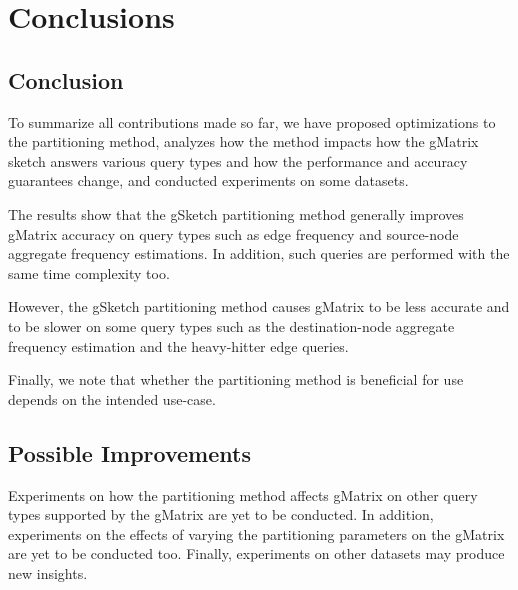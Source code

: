 \chapter{Conclusions}

\ifpdf
\graphicspath{{Chapter4/Figs/Raster/}{Chapter4/Figs/PDF/}{Chapter4/Figs/}}
\else
\graphicspath{{Chapter4/Figs/Vector/}{Chapter4/Figs/}}
\fi

\section{Conclusion}

To summarize all contributions made so far, we have proposed optimizations to the partitioning method, analyzes how the method impacts how the gMatrix sketch answers various query types and how the performance and accuracy guarantees change, and conducted experiments on some datasets.

The results show that the gSketch partitioning method generally improves gMatrix accuracy on query types such as edge frequency and source-node aggregate frequency estimations. In addition, such queries are performed with the same time complexity too.

However, the gSketch partitioning method causes gMatrix to be less accurate and to be slower on some query types such as the destination-node aggregate frequency estimation and the heavy-hitter edge queries.

Finally, we note that whether the partitioning method is beneficial for use depends on the intended use-case.

\section{Possible Improvements}

Experiments on how the partitioning method affects gMatrix on other query types supported by the gMatrix are yet to be conducted. In addition, experiments on the effects of varying the partitioning parameters on the gMatrix are yet to be conducted too. Finally, experiments on other datasets may produce new insights.
